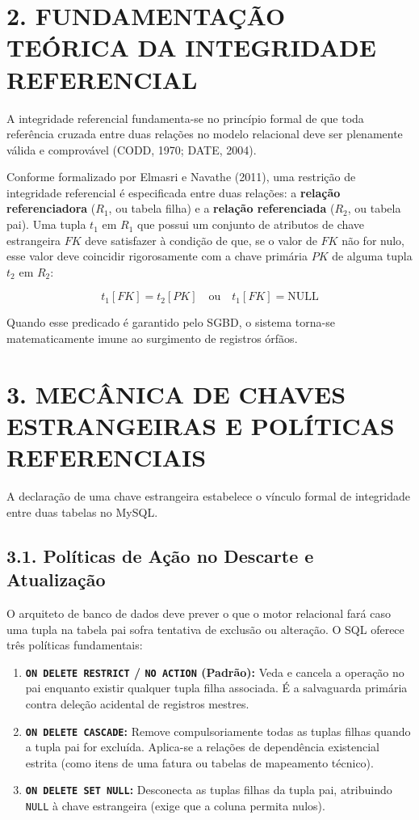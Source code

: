 \newpage

\section*{2. FUNDAMENTAÇÃO TEÓRICA DA INTEGRIDADE REFERENCIAL}

A integridade referencial fundamenta-se no princípio formal de que toda referência cruzada entre duas relações no modelo relacional deve ser plenamente válida e comprovável (CODD, 1970; DATE, 2004). 

Conforme formalizado por Elmasri e Navathe (2011), uma restrição de integridade referencial é especificada entre duas relações: a \textbf{relação referenciadora} ($R_1$, ou tabela filha) e a \textbf{relação referenciada} ($R_2$, ou tabela pai). Uma tupla $t_1$ em $R_1$ que possui um conjunto de atributos de chave estrangeira $FK$ deve satisfazer à condição de que, se o valor de $FK$ não for nulo, esse valor deve coincidir rigorosamente com a chave primária $PK$ de alguma tupla $t_2$ em $R_2$:

\begin{equation}
    t_1[FK] = t_2[PK] \quad \text{ou} \quad t_1[FK] = \text{NULL}
\end{equation}

Quando esse predicado é garantido pelo SGBD, o sistema torna-se matematicamente imune ao surgimento de registros órfãos.

\newpage

\section*{3. MECÂNICA DE CHAVES ESTRANGEIRAS E POLÍTICAS REFERENCIAIS}

A declaração de uma chave estrangeira estabelece o vínculo formal de integridade entre duas tabelas no MySQL.

\subsection*{3.1. Políticas de Ação no Descarte e Atualização}

O arquiteto de banco de dados deve prever o que o motor relacional fará caso uma tupla na tabela pai sofra tentativa de exclusão ou alteração. O SQL oferece três políticas fundamentais:
\begin{enumerate}
    \item \textbf{\texttt{ON DELETE RESTRICT} / \texttt{NO ACTION} (Padrão):} Veda e cancela a operação no pai enquanto existir qualquer tupla filha associada. É a salvaguarda primária contra deleção acidental de registros mestres.
    \item \textbf{\texttt{ON DELETE CASCADE}:} Remove compulsoriamente todas as tuplas filhas quando a tupla pai for excluída. Aplica-se a relações de dependência existencial estrita (como itens de uma fatura ou tabelas de mapeamento técnico).
    \item \textbf{\texttt{ON DELETE SET NULL}:} Desconecta as tuplas filhas da tupla pai, atribuindo \texttt{NULL} à chave estrangeira (exige que a coluna permita nulos).
\end{enumerate}

